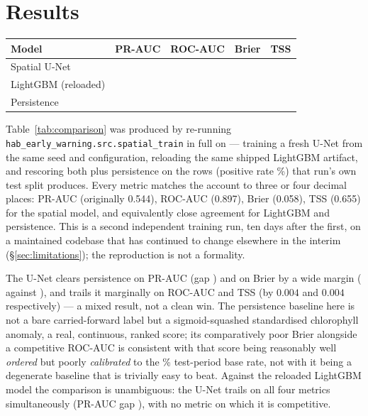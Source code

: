 \section{Results}
\label{sec:results}

\begin{wtable}
\centering
\tabscale
\caption{All three models scored on the identical \NTestRows{} test rows.
Higher is better except Brier. Re-run live on \AsOf{}; the \OrigDate{}
measurement this reproduces is quoted in the text.}
\label{tab:comparison}
\begin{tabular}{lrrrr}
\toprule
Model & PR-AUC & ROC-AUC & Brier & TSS \\
\midrule
Spatial U-Net & \UnetPRAUC{} & \UnetROCAUC{} & \UnetBrier{} & \UnetTSS{} \\
LightGBM (reloaded) & \textbf{\LgbmPRAUC{}} & \textbf{\LgbmROCAUC{}} & \textbf{\LgbmBrier{}} & \textbf{\LgbmTSS{}} \\
Persistence & \PersistPRAUC{} & \PersistROCAUC{} & \PersistBrier{} & \PersistTSS{} \\
\bottomrule
\end{tabular}
\end{wtable}

Table~\ref{tab:comparison} was produced by re-running
\texttt{hab\_early\_warning.src.spatial\_train} in full on \AsOf{} ---
training a fresh U-Net from the same seed and configuration, reloading the
same shipped LightGBM artifact, and rescoring both plus persistence on the
\NTestRows{} rows (positive rate \TestPositiveRate{}\%) that run's own test
split produces. Every metric matches the \OrigDate{} account to three or
four decimal places: PR-AUC \UnetPRAUC{} (originally 0.544), ROC-AUC
\UnetROCAUC{} (0.897), Brier \UnetBrier{} (0.058), TSS \UnetTSS{} (0.655)
for the spatial model, and equivalently close agreement for LightGBM and
persistence. This is a second independent training run, ten days after the
first, on a maintained codebase that has continued to change elsewhere in
the interim (\S\ref{sec:limitations}); the reproduction is not a
formality.

The U-Net clears persistence on PR-AUC (gap \UnetVsPersistGap{}) and on
Brier by a wide margin (\UnetBrier{} against \PersistBrier{}), and trails
it marginally on ROC-AUC and TSS (by \(0.004\) and \(0.004\)
respectively) --- a mixed result, not a clean win. The persistence
baseline here is not a bare carried-forward label but a sigmoid-squashed
standardised chlorophyll anomaly, a real, continuous, ranked score; its
comparatively poor Brier alongside a competitive ROC-AUC is consistent with
that score being reasonably well \emph{ordered} but poorly
\emph{calibrated} to the \TestPositiveRate{}\% test-period base rate, not
with it being a degenerate baseline that is trivially easy to beat. Against
the reloaded LightGBM model the comparison is unambiguous: the U-Net trails
on all four metrics simultaneously (PR-AUC gap \UnetVsLgbmGap{}), with no
metric on which it is competitive.

